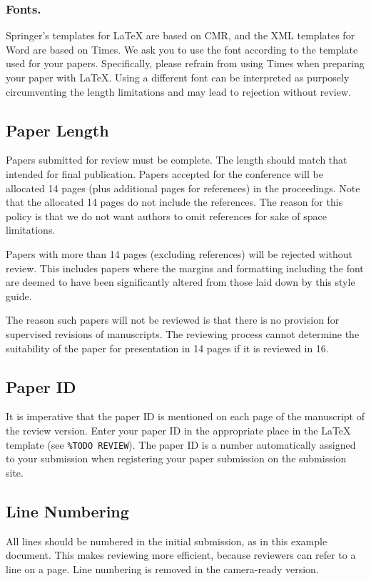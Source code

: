 \documentclass[runningheads]{llncs}
\begin{document}
\subsubsection{Fonts.}
Springer's templates for \LaTeX{} are based on CMR, and the XML templates for Word are based on Times. 
We ask you to use the font according to the template used for your papers. 
Specifically, please refrain from using Times when preparing your paper with \LaTeX{}.
Using a different font can be interpreted as purposely circumventing the length limitations and may lead to rejection without review.


\subsection{Paper Length}
Papers submitted for review must be complete. 
The length should match that intended for final publication. 
Papers accepted for the conference will be allocated 14 pages (plus additional pages for references) in the proceedings. 
Note that the allocated 14 pages do not include the references. 
The reason for this policy is that we do not want authors to omit references for sake of space limitations.

Papers with more than 14 pages (excluding references) will be rejected without review.
This includes papers where the margins and formatting including the font are deemed to have been significantly altered from those laid down by this style guide.

The reason such papers will not be reviewed is that there is no provision for supervised revisions of manuscripts. 
The reviewing process cannot determine the suitability of the paper for presentation in 14 pages if it is reviewed in 16.


\subsection{Paper ID}
It is imperative that the paper ID is mentioned on each page of the manuscript of the review version.
Enter your paper ID in the appropriate place in the \LaTeX{} template (see \texttt{\%TODO REVIEW}).
The paper ID is a number automatically assigned to your submission when registering your paper submission on the submission site.


\subsection{Line Numbering}
\label{sec:line-numbering}
All lines should be numbered in the initial submission, as in this example document. 
This makes reviewing more efficient, because reviewers can refer to a line on a page. 
Line numbering is removed in the camera-ready version.
\end{document}
